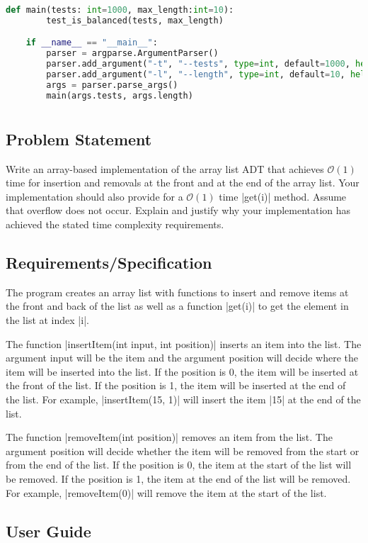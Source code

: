 \documentclass{report}
\begin{document}
\begin{lstlisting}[language=Python]
	def main(tests: int=1000, max_length:int=10):
		test_is_balanced(tests, max_length)

	if __name__ == "__main__":
		parser = argparse.ArgumentParser()
		parser.add_argument("-t", "--tests", type=int, default=1000, help="number of tests to run")
		parser.add_argument("-l", "--length", type=int, default=10, help="maximum length of the statement")
		args = parser.parse_args()
		main(args.tests, args.length)
\end{lstlisting}
\chapter{}
\section{Problem Statement}
Write an array-based implementation of the array list ADT that achieves \(\mathcal{O}(1)\) time for insertion and removals at the front and at the end of the array list. Your implementation should also provide for a \(\mathcal{O}(1)\) time |get(i)| method. Assume that overflow does not occur. Explain and justify why your implementation has achieved the stated time complexity requirements.
\section{Requirements/Specification}
The program creates an array list with functions to insert and remove items at the front and back of the list as well as a function |get(i)| to get the element in the list at index |i|.

The function |insertItem(int input, int position)| inserts an item into the list. The argument input will be the item and the argument position will decide where the item will be inserted into the list. If the position is 0, the item will be inserted at the front of the list. If the position is 1, the item will be inserted at the end of the list. For example, |insertItem(15, 1)| will insert the item |15| at the end of the list.

The function |removeItem(int position)| removes an item from the list. The argument position will decide whether the item will be removed from the start or from the end of the list. If the position is 0, the item at the start of the list will be removed. If the position is 1, the item at the end of the list will be removed. For example, |removeItem(0)| will remove the item at the start of the list.
\section{User Guide}
\end{document}
